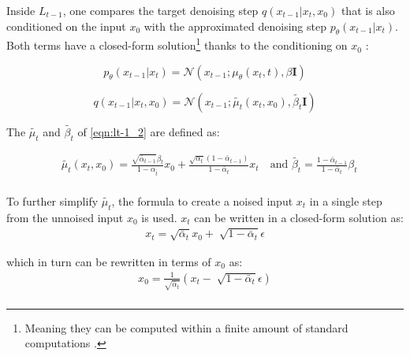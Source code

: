 Inside $L_{t-1}$, one compares the target denoising step $q(x_{t-1}|x_t,x_0)$ that is also conditioned on the input $x_0$ with the approximated denoising step $p_\theta(x_{t-1}|x_t)$. %
Both terms have a closed-form solution\footnote{Meaning they can be computed within a finite amount of standard computations \cite{borwein2013ClosedFormsWhat}.} thanks to the conditioning on $x_0$ \cite{ho2020DenoisingDiffusionProbabilistic}:

\begin{equation}
  \label{eqn:lt-1_1}
  p_\theta(x_{t-1}|x_t)= \mathcal{N}(x_{t-1};\mu_\theta(x_t,t), \beta\textbf{I})
\end{equation}

\begin{equation}
  \label{eqn:lt-1_2}
q(x_{t-1}|x_t,x_0) = \mathcal{N}(x_{t-1};\tilde{\mu_t}(x_t,x_0), \tilde{\beta_t}\textbf{I})
\end{equation}

\noindent The $\tilde{\mu_t}$ and $\tilde{\beta_t}$ of \autoref{eqn:lt-1_2} are defined as:

\begin{equation}
  \begin{align}
    \label{eqn:lt-1_21}
    &\tilde{\mu_t}(x_t, x_0) = \frac{\sqrt{\bar{\alpha}_{t-1}}\beta_t}{1 - \alpha_{\bar{t}}}x_0 +   \frac{\sqrt{\alpha_t}(1-\bar{\alpha}_{t-1})}{1 - \bar{\alpha}_{t}}x_t \quad \textrm{and }
    \tilde{\beta_t} =\frac{1-\bar{\alpha}_{t-1}}{1-\bar{\alpha}_t}\beta_t \\
  \end{align}
\end{equation}

\noindent To further simplify $\tilde{\mu_t}$, the formula to create a noised input $x_t$ in a single step from the unnoised input $x_0$ is used.
$x_t$ can be written in a closed-form solution as:
\begin{equation}
  \begin{align}
    \label{eqn:lt-1_22}
    x_t = \sqrt{\bar{\alpha}_{t}}x_0+\sqrt[]{1-\bar{\alpha}_t}\epsilon
  \end{align}
\end{equation}

\noindent which in turn can be rewritten in terms of $x_0$ as:
\begin{equation}
  \begin{align}
    \label{eqn:lt-1_23}
    x_0 = \frac{1}{\sqrt{\bar{\alpha}_t}}(x_t-\sqrt[]{1-\bar{\alpha}_t}\epsilon) \\
  \end{align}
\end{equation}

